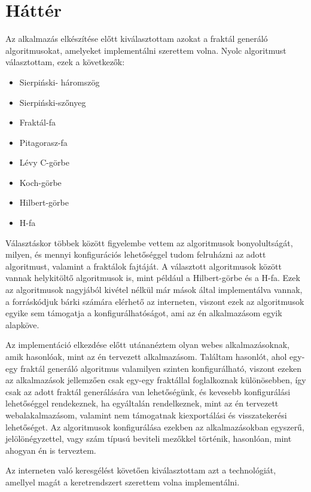 \chapter{Háttér}

Az alkalmazás elkészítése előtt kiválasztottam azokat a fraktál generáló algoritmusokat, amelyeket implementálni szerettem volna. Nyolc algoritmust választottam, ezek a következők: 
\begin{itemize}
	\item Sierpiński- háromszög
	\item Sierpiński-szőnyeg
	\item Fraktál-fa
	\item Pitagorasz-fa
	\item Lévy C-görbe
	\item Koch-görbe
	\item Hilbert-görbe
	\item H-fa
\end{itemize}
Választáskor többek között figyelembe vettem az algoritmusok bonyolultságát, milyen, és mennyi konfigurációs lehetőséggel tudom felruházni az adott algoritmust, valamint a fraktálok fajtáját. A választott algoritmusok között vannak helykitöltő algoritmusok is, mint például a Hilbert-görbe és a H-fa. Ezek az algoritmusok nagyjából kivétel nélkül már mások által implementálva vannak, a forráskódjuk bárki számára elérhető az interneten, viszont ezek az algoritmusok egyike sem támogatja a konfigurálhatóságot, ami az én alkalmazásom egyik alapköve. 
\par Az implementáció elkezdése előtt utánanéztem olyan webes alkalmazásoknak, amik hasonlóak, mint az én tervezett alkalmazásom. Találtam hasonlót, ahol egy-egy fraktál generáló algoritmus valamilyen szinten konfigurálható, viszont ezeken az alkalmazások jellemzően csak egy-egy fraktállal foglalkoznak különösebben, így csak az adott fraktál generálására van lehetőségünk, és kevesebb konfigurálási lehetőséggel rendekeznek, ha egyáltalán rendelkeznek, mint az én tervezett webalakalmazásom, valamint nem támogatnak kiexportálási és visszatekerési lehetőséget. Az algoritmusok konfigurálása ezekben az alkalmazásokban egyszerű, jelölönégyzettel, vagy szám típusú beviteli mezőkkel történik, hasonlóan, mint ahogyan én is terveztem. 
\par Az interneten való keresgélést követően kiválasztottam azt a technológiát, amellyel magát a keretrendszert szerettem volna implementálni.
